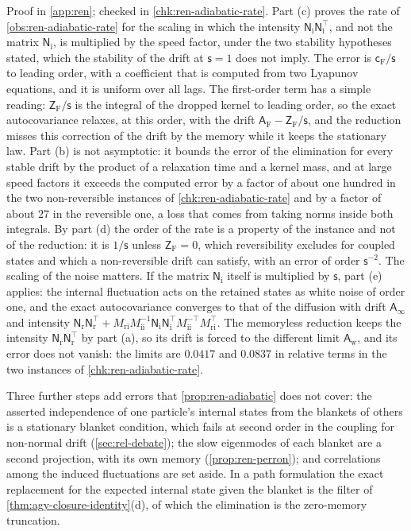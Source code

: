 Proof in \cref{app:ren}; checked in \cref{chk:ren-adiabatic-rate}. Part (c) proves the rate of \cref{obs:ren-adiabatic-rate} for the scaling in which the intensity $\mathsf N_{\mathrm i}\mathsf N_{\mathrm i}^\top$, and not the matrix $\mathsf N_{\mathrm i}$, is multiplied by the speed factor, under the two stability hypotheses stated, which the stability of the drift at $\mathsf s=1$ does not imply. The error is $\mathsf c_{\mathrm F}/\mathsf s$ to leading order, with a coefficient that is computed from two Lyapunov equations, and it is uniform over all lags. The first-order term has a simple reading: $\mathsf Z_{\mathrm F}/\mathsf s$ is the integral of the dropped kernel to leading order, so the exact autocovariance relaxes, at this order, with the drift $\mathsf A_{\mathrm F}-\mathsf Z_{\mathrm F}/\mathsf s$, and the reduction misses this correction of the drift by the memory while it keeps the stationary law. Part (b) is not asymptotic: it bounds the error of the elimination for every stable drift by the product of a relaxation time and a kernel mass, and at large speed factors it exceeds the computed error by a factor of about one hundred in the two non-reversible instances of \cref{chk:ren-adiabatic-rate} and by a factor of about $27$ in the reversible one, a loss that comes from taking norms inside both integrals. By part (d) the order of the rate is a property of the instance and not of the reduction: it is $1/\mathsf s$ unless $\mathsf Z_{\mathrm F}=0$, which reversibility excludes for coupled states and which a non-reversible drift can satisfy, with an error of order $\mathsf s^{-2}$. The scaling of the noise matters. If the matrix $\mathsf N_{\mathrm i}$ itself is multiplied by $\mathsf s$, part (e) applies: the internal fluctuation acts on the retained states as white noise of order one, and the exact autocovariance converges to that of the diffusion with drift $\mathsf A_\infty$ and intensity $\mathsf N_{\mathrm r}\mathsf N_{\mathrm r}^\top+M_{\mathrm{ri}}M_{\mathrm{ii}}^{-1}\mathsf N_{\mathrm i}\mathsf N_{\mathrm i}^\top M_{\mathrm{ii}}^{-\top}M_{\mathrm{ri}}^\top$. The memoryless reduction keeps the intensity $\mathsf N_{\mathrm r}\mathsf N_{\mathrm r}^\top$ by part (a), so its drift is forced to the different limit $\mathsf A_{\mathrm w}$, and its error does not vanish: the limits are $0.0417$ and $0.0837$ in relative terms in the two instances of \cref{chk:ren-adiabatic-rate}.

Three further steps add errors that \cref{prop:ren-adiabatic} does not cover: the asserted independence of one particle's internal states from the blankets of others is a stationary blanket condition, which fails at second order in the coupling for non-normal drift (\cref{sec:rel-debate}); the slow eigenmodes of each blanket are a second projection, with its own memory (\cref{prop:ren-perron}); and correlations among the induced fluctuations are set aside. In a path formulation the exact replacement for the expected internal state given the blanket is the filter of \cref{thm:agy-closure-identity}(d), of which the elimination is the zero-memory truncation.

